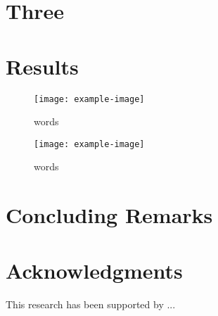 \documentclass[aip,jcp,amsmath,amssymb,floatfix,letterpaper,groupedaddress,
reprint,  %
]{revtex4-1}
\begin{document}
\section{\label{sec:Three}Three}
\lipsum[60-67]
\section{\label{sec:Results}Results}
\begin{figure}[!ht]
    \texttt{[image: example-image]}
    \caption{words}
    \label{fig:one}
\end{figure}

\lipsum[70-76]

\begin{figure*}
    \texttt{[image: example-image]}
    \caption{words}
    \label{fig:two}
\end{figure*}
\section{\label{sec:ConcludingRemarks}Concluding Remarks}
\lipsum[80-86]
\section*{Acknowledgments}
This research has been supported by ...

\end{document}
